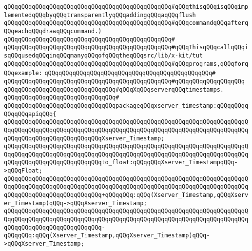 \verb|qQQqqQQqqQQqqQQqqQQqqQQqqQQqqQQqqQQqqQQqqQQqqQQq#qQQqthisqQQqisqQQqimplementedqQQqbyqQQqtransparentlyqQQqaddingqQQqaqQQqflush|\newline
\verb|qQQqqQQqqQQqqQQqqQQqqQQqqQQqqQQqqQQqqQQqqQQqqQQq#qQQqcommandqQQqafterqQQqeachqQQqdrawqQQqcommand.)|\newline
\verb|qQQqqQQqqQQqqQQqqQQqqQQqqQQqqQQqqQQqqQQqqQQqqQQq#|\newline
\verb|qQQqqQQqqQQqqQQqqQQqqQQqqQQqqQQqqQQqqQQqqQQqqQQq#qQQqThisqQQqcallqQQqisqQQqusedqQQqinqQQqmanyqQQqofqQQqtheqQQqsrc/lib/x-kit/tut|\newline
\verb|qQQqqQQqqQQqqQQqqQQqqQQqqQQqqQQqqQQqqQQqqQQqqQQq#qQQqprograms,qQQqforqQQqexample:|\newline
\verb|qQQqqQQqqQQqqQQqqQQqqQQqqQQqqQQqqQQqqQQqqQQqqQQq#|\newline
\verb|qQQqqQQqqQQqqQQqqQQqqQQqqQQqqQQqqQQqqQQqqQQqqQQq#qQQqqQQqqQQqqQQqqQQq|\newline
\newline
\newline
\verb|qQQqqQQqqQQqqQQqqQQqqQQqqQQqqQQq#qQQqXqQQqserverqQQqtimestamps.|\newline
\verb|qQQqqQQqqQQqqQQqqQQqqQQqqQQqqQQq#|\newline
\verb|qQQqqQQqqQQqqQQqqQQqqQQqqQQqqQQqpackageqQQqxserver_timestamp:qQQqqQQqqQQqqQQqapiqQQq{|\newline
\verb|qQQqqQQqqQQqqQQqqQQqqQQqqQQqqQQqqQQqqQQqqQQqqQQqqQQqqQQqqQQqqQQqqQQqqQQqqQQqqQQqqQQqqQQqqQQqqQQqqQQqqQQqqQQqqQQqqQQqqQQqqQQqqQQqqQQqqQQqqQQqqQQqqQQqqQQqqQQqqQQqqQQqqQQqXserver_Timestamp;|\newline
\newline
\verb|qQQqqQQqqQQqqQQqqQQqqQQqqQQqqQQqqQQqqQQqqQQqqQQqqQQqqQQqqQQqqQQqqQQqqQQqqQQqqQQqqQQqqQQqqQQqqQQqqQQqqQQqqQQqqQQqqQQqqQQqqQQqqQQqqQQqqQQqqQQqqQQqqQQqqQQqqQQqqQQqqQQqqQQqto_float:qQQqqQQqXserver_TimestampqQQq->qQQqFloat;|\newline
\newline
\verb|qQQqqQQqqQQqqQQqqQQqqQQqqQQqqQQqqQQqqQQqqQQqqQQqqQQqqQQqqQQqqQQqqQQqqQQqqQQqqQQqqQQqqQQqqQQqqQQqqQQqqQQqqQQqqQQqqQQqqQQqqQQqqQQqqQQqqQQqqQQqqQQqqQQqqQQqqQQqqQQqqQQqqQQq+qQQqqQQq:qQQq(Xserver_Timestamp,qQQqXserver_Timestamp)qQQq->qQQqXserver_Timestamp;|\newline
\verb|qQQqqQQqqQQqqQQqqQQqqQQqqQQqqQQqqQQqqQQqqQQqqQQqqQQqqQQqqQQqqQQqqQQqqQQqqQQqqQQqqQQqqQQqqQQqqQQqqQQqqQQqqQQqqQQqqQQqqQQqqQQqqQQqqQQqqQQqqQQqqQQqqQQqqQQqqQQqqQQqqQQqqQQq-qQQqqQQq:qQQq(Xserver_Timestamp,qQQqXserver_Timestamp)qQQq->qQQqXserver_Timestamp;|\newline
